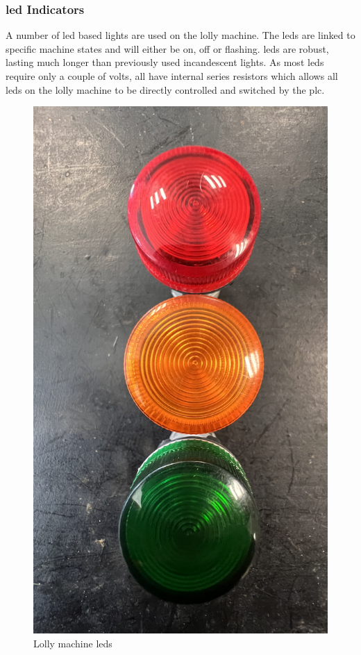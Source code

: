     \subsubsection{\acrshort{led} Indicators}
        A number of \acrshort{led} based lights are used on the lolly machine. The \acrshort{led}s are linked to specific machine states and will either be on, off  or flashing. \acrshort{led}s are robust, lasting much longer than previously used incandescent lights. As most \acrshort{led}s require only a couple of volts, all have internal series resistors which allows all \acrshort{led}s on the lolly machine to be directly controlled and switched by the \acrshort{plc}.
        
        \begin{figure}[H]
            \centering
            \includegraphics[scale = 0.3]{2_images/leds.png}
            \caption{Lolly machine \acrshort{led}s}
            \label{fig:leds}
        \end{figure} 
        
